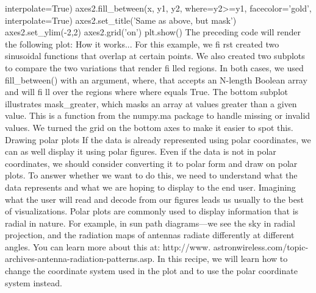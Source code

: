 interpolate=True)
axes2.fill_between(x, y1, y2, where=y2>=y1, facecolor='gold',
interpolate=True)
axes2.set_title('Same as above, but mask')
axes2.set_ylim(-2,2)
axes2.grid('on')
plt.show()
The preceding code will render the following plot:
How it works...
For this example, we fi rst created two sinusoidal functions that overlap at certain points.
We also created two subplots to compare the two variations that render fi lled regions.
In both cases, we used fill_between() with an argument, where, that accepts an
N-length Boolean array and will fi ll over the regions where where equals True.
The bottom subplot illustrates mask_greater, which masks an array at values greater than
a given value. This is a function from the numpy.ma package to handle missing or invalid
values. We turned the grid on the bottom axes to make it easier to spot this.
Drawing polar plots
If the data is already represented using polar coordinates, we can as well display it using polar
figures. Even if the data is not in polar coordinates, we should consider converting it to polar
form and draw on polar plots.
To answer whether we want to do this, we need to understand what the data represents and
what we are hoping to display to the end user. Imagining what the user will read and decode
from our figures leads us usually to the best of visualizations.
Polar plots are commonly used to display information that is radial in nature. For example, in
sun path diagrams—we see the sky in radial projection, and the radiation maps of antennas
radiate differently at different angles. You can learn more about this at: http://www.
astronwireless.com/topic-archives-antenna-radiation-patterns.asp.
In this recipe, we will learn how to change the coordinate system used in the plot and to use
the polar coordinate system instead.
